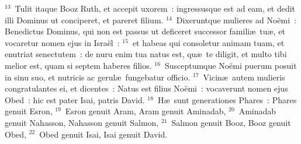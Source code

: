 ${}^{13}$~Tulit itaque Booz Ruth, et accepit uxorem~: ingressusque est ad eam, et dedit illi Dominus ut conciperet, et pareret filium.
${}^{14}$~Dixeruntque mulieres ad No\"emi~: Benedictus Dominus, qui non est passus ut deficeret successor famili\ae\ tu\ae , et vocaretur nomen ejus in Isra\"el~:
${}^{15}$~et habeas qui consoletur animam tuam, et enutriat senectutem~: de nuru enim tua natus est, qu\ae\ te diligit, et multo tibi melior est, quam si septem haberes filios.
${}^{16}$~Susceptumque No\"emi puerum posuit in sinu suo, et nutricis ac gerul\ae\ fungebatur officio.
${}^{17}$~Vicin\ae\ autem mulieris congratulantes ei, et dicentes~: Natus est filius No\"emi~: vocaverunt nomen ejus Obed~: hic est pater Isai, patris David.
${}^{18}$~H\ae\ sunt generationes Phares~: Phares genuit Esron,
${}^{19}$~Esron genuit Aram, Aram genuit Aminadab,
${}^{20}$~Aminadab genuit Nahasson, Nahasson genuit Salmon,
${}^{21}$~Salmon genuit Booz, Booz genuit Obed,
${}^{22}$~Obed genuit Isai, Isai genuit David.
